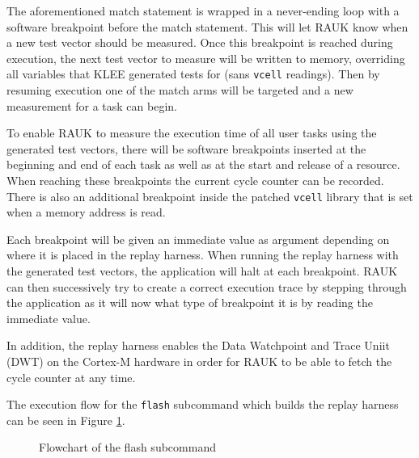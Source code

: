 The aforementioned match statement is wrapped in a never-ending loop with a
software breakpoint before the match statement. This will let RAUK know when a
new test vector should be measured. Once this breakpoint is reached during
execution, the next test vector to measure will be written to memory,
overriding all variables that KLEE generated tests for (sans \texttt{vcell}
readings). Then by resuming execution one of the match arms will be targeted
and a new measurement for a task can begin.


To enable RAUK to measure the execution time of all user tasks using the
generated test vectors, there will be software breakpoints inserted at the
beginning and end of each task as well as at the start and release of a
resource. When reaching these breakpoints the current cycle counter can be
recorded. There is also an additional breakpoint inside the patched
\texttt{vcell} library that is set when a memory address is read.

Each breakpoint will be given an immediate value as argument depending on where
it is placed in the replay harness. When running the replay harness with the
generated test vectors, the application will halt at each breakpoint. RAUK can
then successively try to create a correct execution trace by stepping through
the application as it will now what type of breakpoint it is by reading the
immediate value.

In addition, the replay harness enables the Data Watchpoint and Trace Uniit
(DWT) on the Cortex-M hardware in order for RAUK to be able to fetch the cycle
counter at any time.

The execution flow for the \texttt{flash} subcommand which builds the replay
harness can be seen in Figure \ref{fig:flashcmd}.
\begin{figure}[H]
    \centering
    \caption{Flowchart of the flash subcommand}
    \label{fig:flashcmd}
\end{figure}


